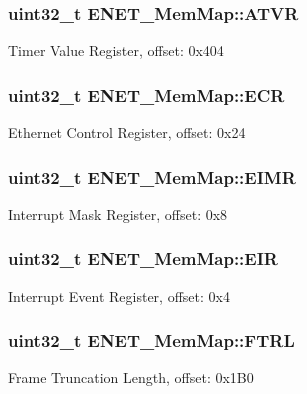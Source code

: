 \subsubsection[{A\+T\+V\+R}]{\setlength{\rightskip}{0pt plus 5cm}uint32\+\_\+t E\+N\+E\+T\+\_\+\+Mem\+Map\+::\+A\+T\+V\+R}\label{struct_e_n_e_t___mem_map_a28e2d519809c574a0b4c3161bfe16545}
Timer Value Register, offset\+: 0x404 \hypertarget{struct_e_n_e_t___mem_map_acecfb77364c642e2f4c404101154b84e}{}
\subsubsection[{E\+C\+R}]{\setlength{\rightskip}{0pt plus 5cm}uint32\+\_\+t E\+N\+E\+T\+\_\+\+Mem\+Map\+::\+E\+C\+R}\label{struct_e_n_e_t___mem_map_acecfb77364c642e2f4c404101154b84e}
Ethernet Control Register, offset\+: 0x24 \hypertarget{struct_e_n_e_t___mem_map_afc82bb113d2a15c34b9704d14d52bde7}{}
\subsubsection[{E\+I\+M\+R}]{\setlength{\rightskip}{0pt plus 5cm}uint32\+\_\+t E\+N\+E\+T\+\_\+\+Mem\+Map\+::\+E\+I\+M\+R}\label{struct_e_n_e_t___mem_map_afc82bb113d2a15c34b9704d14d52bde7}
Interrupt Mask Register, offset\+: 0x8 \hypertarget{struct_e_n_e_t___mem_map_a29d8a8af55bce6f1482fc85b39ead867}{}
\subsubsection[{E\+I\+R}]{\setlength{\rightskip}{0pt plus 5cm}uint32\+\_\+t E\+N\+E\+T\+\_\+\+Mem\+Map\+::\+E\+I\+R}\label{struct_e_n_e_t___mem_map_a29d8a8af55bce6f1482fc85b39ead867}
Interrupt Event Register, offset\+: 0x4 \hypertarget{struct_e_n_e_t___mem_map_a810941b10afea757173e9807b8ee28f6}{}
\subsubsection[{F\+T\+R\+L}]{\setlength{\rightskip}{0pt plus 5cm}uint32\+\_\+t E\+N\+E\+T\+\_\+\+Mem\+Map\+::\+F\+T\+R\+L}\label{struct_e_n_e_t___mem_map_a810941b10afea757173e9807b8ee28f6}
Frame Truncation Length, offset\+: 0x1\+B0 \hypertarget{struct_e_n_e_t___mem_map_a66dd66dae8c45fd2658eec6ea05dd7dd}{}
